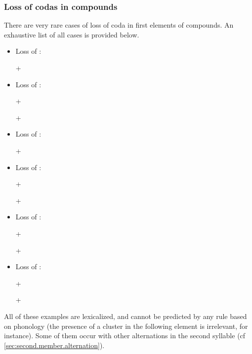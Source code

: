 \subsubsection{Loss of codas in compounds} \label{sec:loss.codas.compounds}
There are very rare cases of loss of coda in first elements of compounds. An exhaustive list of all cases is provided below.

\begin{itemize}
\item Loss of : 

  +  \fl{}    
\item Loss of  : 

 +  \fl{}   

  +  \fl{}   
\item Loss of : 

  +  \fl{}    
\item Loss of :

  +  \fl{}   

 +  \fl{}    
\item Loss of :

   +   \fl{}    
 
  +  \fl{}   
\item Loss of : 

 +  \fl{}    

 +  \fl{}    
\end{itemize}

All of these examples are lexicalized, and cannot be predicted by any rule based on phonology (the presence of a cluster in the following element is irrelevant, for instance). Some of them occur with other alternations in the second syllable (cf \ref{sec:second.member.alternation}).

